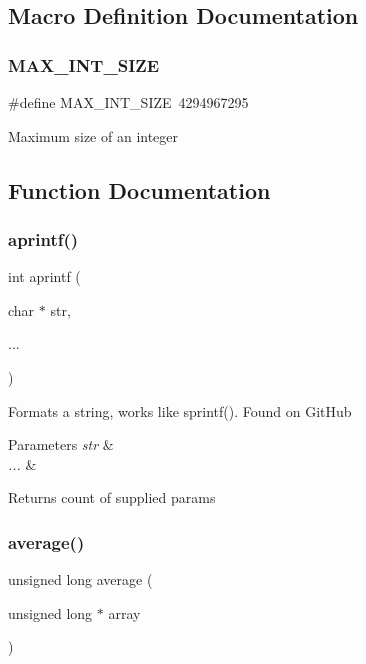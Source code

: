 \subsection{Macro Definition Documentation}
\mbox{\label{test_8ino_a774a906ceb2672aee07483be36134011}} 
\subsubsection{\texorpdfstring{MAX\_INT\_SIZE}{MAX\_INT\_SIZE}}
{\footnotesize\ttfamily \#define M\+A\+X\+\_\+\+I\+N\+T\+\_\+\+S\+I\+ZE~4294967295}

Maximum size of an integer 

\subsection{Function Documentation}
\mbox{\label{test_8ino_acf86b2821b6508dcc5b16428d63d1dfd}} 
\subsubsection{\texorpdfstring{aprintf()}{aprintf()}}
{\footnotesize\ttfamily int aprintf (\begin{DoxyParamCaption}\item[{char $\ast$}]{str,  }\item[{}]{... }\end{DoxyParamCaption})}

Formats a string, works like sprintf(). Found on Git\+Hub 
\begin{DoxyParams}{Parameters}
{\em str} & \\
\hline
{\em ...} & \\
\hline
\end{DoxyParams}
\begin{DoxyReturn}{Returns}
count of supplied params 
\end{DoxyReturn}
\mbox{\label{test_8ino_a3f58cad8e546d58d8d275655e22964c9}} 
\subsubsection{\texorpdfstring{average()}{average()}}
{\footnotesize\ttfamily unsigned long average (\begin{DoxyParamCaption}\item[{unsigned long $\ast$}]{array }\end{DoxyParamCaption})}

